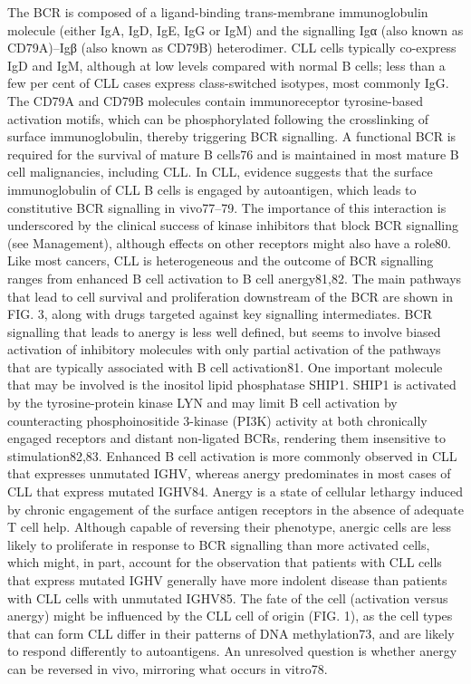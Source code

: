 \documentclass[11pt, a4paper, twosided]{book}
\begin{document}
The BCR is composed of a ligand-binding trans-membrane immunoglobulin molecule (either IgA, IgD, IgE, IgG or IgM) and the signalling Igα (also known as CD79A)--Igβ (also known as CD79B) heterodimer. CLL cells typically co-express IgD and IgM, although at low levels compared with normal B cells; less than a few per cent of CLL cases express class-switched isotypes, most commonly IgG. The CD79A and CD79B molecules contain immunoreceptor tyrosine-based activation motifs, which can be phosphorylated following the crosslinking of surface immunoglobulin, thereby triggering BCR signalling. A functional BCR is required for the survival of mature B cells76 and is maintained in most mature B cell malignancies, including CLL. In CLL, evidence suggests that the surface immunoglobulin of CLL B cells is engaged by autoantigen, which leads to constitutive BCR signalling in vivo77--79. The importance of this interaction is underscored by the clinical success of kinase inhibitors that block BCR signalling (see Management), although effects on other receptors might also have a role80.
Like most cancers, CLL is heterogeneous and the outcome of BCR signalling ranges from enhanced B cell activation to B cell anergy81,82. The main pathways that lead to cell survival and proliferation downstream of the BCR are shown in FIG. 3, along with drugs targeted against key signalling intermediates. BCR signalling that leads to anergy is less well defined, but seems to involve biased activation of inhibitory molecules with only partial activation of the pathways that are typically associated with B cell activation81. One important molecule that may be involved is the inositol lipid phosphatase SHIP1. SHIP1 is activated by the tyrosine-protein kinase LYN and may limit B cell activation by counteracting phosphoinositide 3-kinase (PI3K) activity at both chronically engaged receptors and distant non-ligated BCRs, rendering them insensitive to stimulation82,83.
Enhanced B cell activation is more commonly observed in CLL that expresses unmutated IGHV, whereas anergy predominates in most cases of CLL that express mutated IGHV84. Anergy is a state of cellular lethargy induced by chronic engagement of the surface antigen receptors in the absence of adequate T cell help. Although capable of reversing their phenotype, anergic cells are less likely to proliferate in response to BCR signalling than more activated cells, which might, in part, account for the observation that patients with CLL cells that express mutated IGHV generally have more indolent disease than patients with CLL cells with unmutated IGHV85. The fate of the cell (activation versus anergy) might be influenced by the CLL cell of origin (FIG. 1), as the cell types that can form CLL differ in their patterns of DNA methylation73, and are likely to respond differently to autoantigens. An unresolved question is whether anergy can be reversed in vivo, mirroring what occurs in vitro78.
\end{document}

